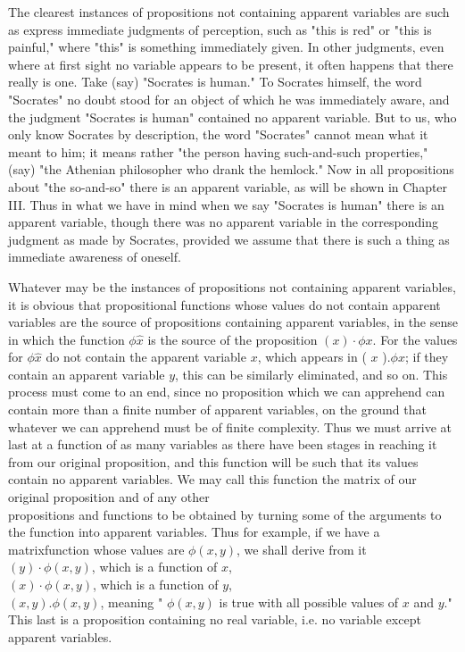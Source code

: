 \documentclass[10pt]{article}
\begin{document}
The clearest instances of propositions not containing apparent variables are such as express immediate judgments of perception, such as "this is red" or "this is painful," where "this" is something immediately given. In other judgments, even where at first sight no variable appears to be present, it often happens that there really is one. Take (say) "Socrates is human." To Socrates himself, the word "Socrates" no doubt stood for an object of which he was immediately aware, and the judgment "Socrates is human" contained no apparent variable. But to us, who only know Socrates by description, the word "Socrates" cannot mean what it meant to him; it means rather "the person having such-and-such properties," (say) "the Athenian philosopher who drank the hemlock." Now in all propositions about "the so-and-so" there is an apparent variable, as will be shown in Chapter III. Thus in what we have in mind when we say "Socrates is human" there is an apparent variable, though there was no apparent variable in the corresponding judgment as made by Socrates, provided we assume that there is such a thing as immediate awareness of oneself.

Whatever may be the instances of propositions not containing apparent variables, it is obvious that propositional functions whose values do not contain apparent variables are the source of propositions containing apparent variables, in the sense in which the function $\phi \hat{x}$ is the source of the proposition $(x) \cdot \phi x$. For the values for $\phi \hat{x}$ do not contain the apparent variable $x$, which appears in ( $x$ ).$\phi x$; if they contain an apparent variable $y$, this can be similarly eliminated, and so on. This process must come to an end, since no proposition which we can apprehend can contain more than a finite number of apparent variables, on the ground that whatever we can apprehend must be of finite complexity. Thus we must arrive at last at a function of as many variables as there have been stages in reaching it from our original proposition, and this function will be such that its values contain no apparent variables. We may call this function the matrix of our original proposition and of any other\\
propositions and functions to be obtained by turning some of the arguments to the function into apparent variables. Thus for example, if we have a matrixfunction whose values are $\phi(x, y)$, we shall derive from it\\
$(y) \cdot \phi(x, y)$, which is a function of $x$,\\
$(x) \cdot \phi(x, y)$, which is a function of $y$,\\
$(x, y) . \phi(x, y)$, meaning " $\phi(x, y)$ is true with all possible values of $x$ and $y$." This last is a proposition containing no real variable, i.e. no variable except apparent variables.
\end{document}
